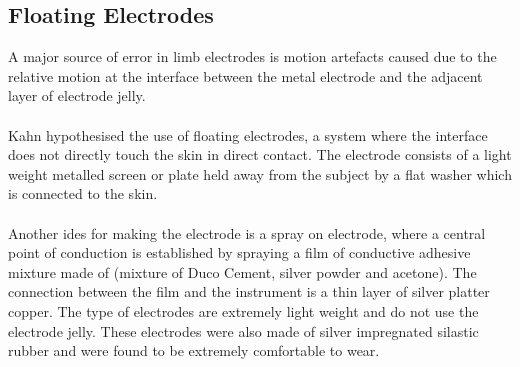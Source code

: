 \documentclass{article}
\begin{document}
\subsection{Floating Electrodes}
A major source of error in limb electrodes is motion artefacts caused due to the relative motion at the interface between the metal electrode and the adjacent layer of electrode jelly.\\
\\
Kahn hypothesised the use of floating electrodes, a system where the interface does not directly touch the skin in direct contact. The electrode consists of a light weight metalled screen or plate held away from the subject by a flat washer which is connected to the skin.\\
\\
Another ides for making the electrode is a spray on electrode, where a central point of conduction is established by spraying a film of conductive adhesive mixture made of (mixture of Duco Cement, silver powder and acetone). The connection between the film and the instrument is a thin layer of silver platter copper. The type of electrodes are extremely light weight and do not use the electrode jelly. These electrodes were also made of silver impregnated silastic rubber and were found to be extremely comfortable to wear. 
\end{document}
